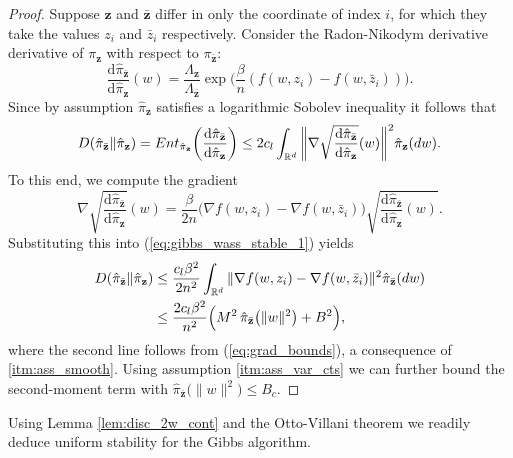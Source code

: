 \documentclass{article}
\newcommand{\Bbf}[1]{\mathbf{#1}}
\newcommand{\Brm}[1]{\mathrm{#1}}
\begin{document}
\begin{proof}
Suppose \(\Bbf{z}\) and \(\bar{\Bbf{z}}\) differ in only the coordinate of index \(i\), for which they take the values \(z_i\) and \(\bar{z}_i\) respectively. Consider the Radon-Nikodym derivative derivative of \(\pi_{\Bbf{z}}\) with respect to \(\pi_{\bar{\Bbf{z}}}\):
\begin{equation*}
    \frac{\Brm{d}\hat{\pi}_{\bar{\Bbf{z}}}}{\Brm{d}\hat{\pi}_{\Bbf{z}}}(w) = \frac{\Lambda_{\Bbf{z}}}{\Lambda_{\bar{\Bbf{z}}}} \exp \bigg (\frac{\beta}{n}(f(w, z_i) - f(w, \bar{z}_i)) \bigg ).
\end{equation*}
Since by assumption \(\hat{\pi}_{\Bbf{z}}\) satisfies a logarithmic Sobolev inequality it follows that
\begin{equation}\label{eq:gibbs_wass_stable_1}
    D(\hat{\pi}_{\bar{\Bbf{z}}} \| \hat{\pi}_{\Bbf{z}}) = Ent_{\hat{\pi}_{\Bbf{z}}} \bigg ( \frac{\Brm{d}\hat{\pi}_{\bar{\Bbf{z}}}}{\Brm{d}\hat{\pi}_{\Bbf{z}}} \bigg ) \leq 2 c_l \int_{\Bbb{R}^d} \bigg \| \nabla \sqrt{\frac{\Brm{d}\hat{\pi}_{\bar{\Bbf{z}}}}{\Brm{d}\hat{\pi}_{\Bbf{z}}}}(w) \bigg \|^2 \hat{\pi}_{\Bbf{z}}(dw).
\end{equation}
To this end, we compute the gradient
\begin{equation*}
    \nabla \sqrt{\frac{\Brm{d}\hat{\pi}_{\bar{\Bbf{z}}}}{\Brm{d}\hat{\pi}_{\Bbf{z}}}}(w) = \frac{\beta}{2n} \big ( \nabla f(w, z_i) - \nabla f(w, \bar{z}_i) \big ) \sqrt{\frac{\Brm{d}\hat{\pi}_{\bar{\Bbf{z}}}}{\Brm{d}\hat{\pi}_{\Bbf{z}}}(w)}.
\end{equation*}
Substituting this into (\ref{eq:gibbs_wass_stable_1}) yields
\begin{align*}
    D(\hat{\pi}_{\bar{\Bbf{z}}} \| \hat{\pi}_{\Bbf{z}}) &\leq \frac{c_l \beta^2}{2 n^2} \int_{\Bbb{R}^d} \| \nabla f(w, z_i) - \nabla f(w, \bar{z}_i) \|^2 \hat{\pi}_{\bar{\Bbf{z}}}(dw)\\
    &\leq \frac{2 c_l \beta^2}{n^2} \Big ( M^2 \,  \hat{\pi}_{\bar{\Bbf{z}}} \big (\|w\|^2 \big ) + B^2 \Big ),
\end{align*}
where the second line follows from (\ref{eq:grad_bounds}), a consequence of \ref{itm:ass_smooth}. Using assumption \ref{itm:ass_var_cts} we can further bound the second-moment term with \(\hat{\pi}_{\bar{\Bbf{z}}} \big (\|w\|^2 \big ) \leq B_c\).
\end{proof}

Using Lemma \ref{lem:disc_2w_cont} and the Otto-Villani theorem we readily deduce uniform stability for the Gibbs algorithm.
\end{document}
